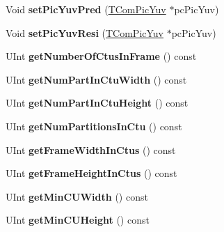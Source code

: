 \begin{DoxyCompactItemize}
\item 
\mbox{\label{class_t_com_pic_a0b3b2029e22864607c60373bfaea23d9}} 
Void {\bfseries set\+Pic\+Yuv\+Pred} (\hyperlink{class_t_com_pic_yuv}{T\+Com\+Pic\+Yuv} $\ast$pc\+Pic\+Yuv)
\item 
\mbox{\label{class_t_com_pic_a95efda3150ad8b1c1d5a3906e4d82882}} 
Void {\bfseries set\+Pic\+Yuv\+Resi} (\hyperlink{class_t_com_pic_yuv}{T\+Com\+Pic\+Yuv} $\ast$pc\+Pic\+Yuv)
\item 
\mbox{\label{class_t_com_pic_aa94b7a896806f3b226a471c1cd48cb3c}} 
U\+Int {\bfseries get\+Number\+Of\+Ctus\+In\+Frame} () const
\item 
\mbox{\label{class_t_com_pic_aeb5b5befe036ff8dc6407fabc6d698f7}} 
U\+Int {\bfseries get\+Num\+Part\+In\+Ctu\+Width} () const
\item 
\mbox{\label{class_t_com_pic_a24ea141e4296a9463616bd54c3afe66d}} 
U\+Int {\bfseries get\+Num\+Part\+In\+Ctu\+Height} () const
\item 
\mbox{\label{class_t_com_pic_a349e1f78949408f2402773249a1e163d}} 
U\+Int {\bfseries get\+Num\+Partitions\+In\+Ctu} () const
\item 
\mbox{\label{class_t_com_pic_a448ec2c423966c6aeda96c2ab6ff3421}} 
U\+Int {\bfseries get\+Frame\+Width\+In\+Ctus} () const
\item 
\mbox{\label{class_t_com_pic_adeb45a622f8f2f952a3964fdaaa17ff9}} 
U\+Int {\bfseries get\+Frame\+Height\+In\+Ctus} () const
\item 
\mbox{\label{class_t_com_pic_a51d829a23bcb2e09f12ac392f1d0459d}} 
U\+Int {\bfseries get\+Min\+C\+U\+Width} () const
\item 
\mbox{\label{class_t_com_pic_a2530d0aefe3840dea91b70b69c1523ad}} 
U\+Int {\bfseries get\+Min\+C\+U\+Height} () const
\item 
\mbox{\label{class_t_com_pic_ae4a2017e971a025309f7d645e5164a5f}} 

\end{DoxyCompactItemize}
